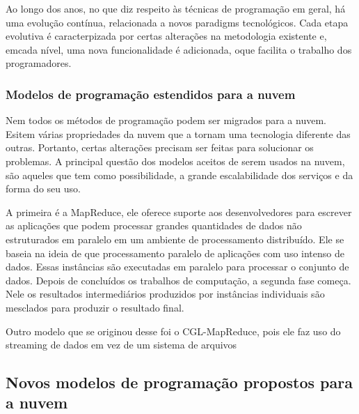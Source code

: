 \documentclass[12pt, a4paper]{paper}
\begin{document}
Ao longo dos anos, no que diz respeito às técnicas de programação em geral, há uma 
evolução contínua, relacionada a novos paradigms tecnológicos. Cada etapa evolutiva 
é caracterpizada por certas alterações na metodologia existente e, emcada nível, uma 
nova funcionalidade é adicionada, oque facilita o trabalho dos programadores. 

\subsubsection{Modelos de programação estendidos para a nuvem } %
\label{sec:Modelos de programação estendidos para a nuvem }
Nem todos os métodos de programação podem ser migrados para a nuvem. Esitem várias 
propriedades da nuvem que a tornam uma tecnologia diferente das outras. Portanto, certas
alterações precisam ser feitas para solucionar os problemas. A principal questão dos 
modelos aceitos de serem usados na nuvem, são aqueles que tem como possibilidade, a 
grande escalabilidade dos serviços e da forma do seu uso.

A primeira é a MapReduce, ele oferece suporte aos desenvolvedores para escrever as 
aplicações que podem processar grandes quantidades de dados não estruturados em 
paralelo em um ambiente de processamento distribuído. Ele se baseia na ideia de que 
processamento paralelo de aplicações com uso intenso de dados. Essas instâncias são 
executadas em paralelo para processar o conjunto de dados. Depois de concluídos os 
trabalhos de computação, a segunda fase começa. Nele os resultados intermediários 
produzidos por instâncias individuais são mesclados para produzir o resultado final. 

Outro modelo que se originou desse foi o CGL-MapReduce, pois ele faz uso do streaming 
de dados em vez de um sistema de arquivos

\subsection{Novos modelos de programação propostos para a nuvem} %
\label{sub:Novos modelos de programação propostos para a nuvem}











\end{document}
